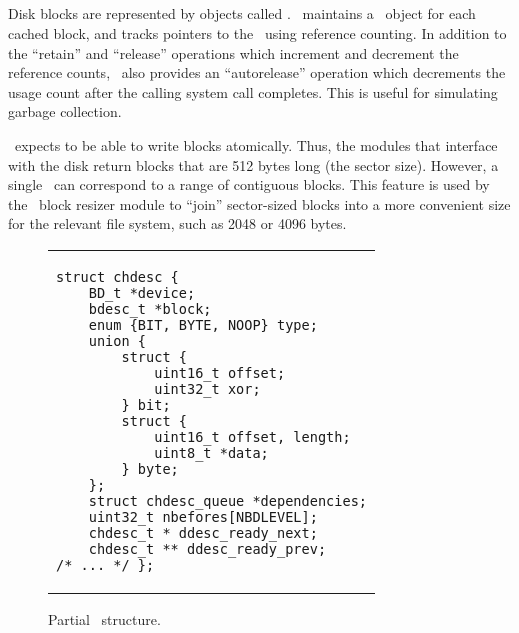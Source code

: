 
\subsection{\BDescs}

Disk blocks are represented by objects called \emph{\bdescs}.
\Kudos\ maintains a \bdesc\ object for each cached block, and tracks
pointers to the \bdescs\ using reference counting. In addition to the
``retain'' and ``release'' operations which increment and decrement the
reference counts, \Kudos\ also provides an ``autorelease'' operation which
decrements the usage count after the calling system call completes. This is
useful for simulating garbage collection.

\Kudos\ expects to be able to write blocks atomically. Thus, the modules that
interface with the disk return blocks that are 512 bytes long (the sector
size). However, a single \bdesc\ can correspond to a range of
contiguous blocks. This feature is used by the \Kudos\ block resizer module to
``join'' sector-sized blocks into a more convenient size for the relevant file
system, such as 2048 or 4096 bytes.


\begin{figure}[t]
\vskip-14pt
\begin{tabular}{@{\hskip0.58in}p{2in}@{}}
\begin{scriptsize}
\begin{verbatim}
struct chdesc {
    BD_t *device;
    bdesc_t *block;
    enum {BIT, BYTE, NOOP} type;
    union {
        struct {
            uint16_t offset;
            uint32_t xor;
        } bit;
        struct {
            uint16_t offset, length;
            uint8_t *data;
        } byte;
    };
    struct chdesc_queue *dependencies;
    uint32_t nbefores[NBDLEVEL];
    chdesc_t * ddesc_ready_next;
    chdesc_t ** ddesc_ready_prev;
/* ... */ };
\end{verbatim}
\end{scriptsize}
\end{tabular}
\vspace{-10pt}
\caption{\label{fig:chdesc} Partial \chdesc\ structure.}
\end{figure}


\subsection {\ChDescs}
\label{sec:design:chdescs}

